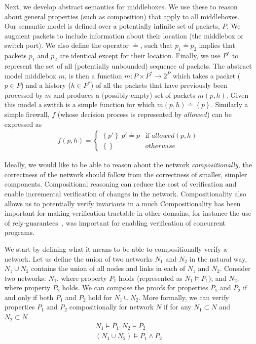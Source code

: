 Next, we develop abstract semantics for middleboxes. We use these to reason about general properties (such as composition) that apply to all middleboxes. Our semantic model is defined over a potentially infinite set of packets, $P$.  We augment packets to include information about their location (\ie the
middlebox or
switch port). We also define the operator $\doteq$, such that $p_1 \doteq p_2$ implies that packets $p_1$ and $p_2$ are identical except for their location.
Finally, we use $P^*$ to represent the set of all (potentially unbounded) sequence of packets.
The abstract model middlebox $m$, is then a function $m\colon P\times P^* \to 2^P$ which takes a packet ($p\in P$) and a history ($h\in P^*$) 
of all the packets that have
previously been processed by $m$ and produces a (possibly empty) set of packets $m(p, h)$. Given this model a switch is a simple function for which
$m(p, h) \doteq \left\{p\right\}$. Similarly a simple firewall, $f$ (whose decision process is represented by $allowed$) can be expressed as
\begin{align*}
 f(p, h) = \begin{cases}
    \left\{p'\right\}\ p' \doteq p & \mbox{if } allowed(p, h)\\
    \left\{\right\} & otherwise
 \end{cases}
\end{align*}

Ideally, we would like to be able to reason about the network \emph{compositionally}, \ie the correctness of the network should follow from
the correctness of smaller, simpler components. Compositional reasoning can reduce the cost of verification and enable incremental verification
of changes in the network. Compositionality also allows us to potentially verify invariants in a much 
Compositionality has been important for making verification tractable in other domains, for instance the use of
rely-guarantees~\cite{tse:MisraC81,ifip:Jones83}, was important for enabling verification of concurrent programs.

We start by defining what it means to be able to compositionally verify a network. Let us
define the union of two networks $N_1$ and $N_2$ in the natural way, \ie $N_1\cup N_2$ contains the union of all nodes and links in each of $N_1$ and $N_2$.
Consider two networks: $N_1$, where property $P_1$ holds (represented as $N_1\models P_1$); and $N_2$, where property $P_2$ holds. We can compose the proofs
for properties $P_1$ and $P_2$ if and only if  both $P_1$ and $P_2$ hold for $N_1 \cup N_2$. More formally, we can verify properties $P_1$ and $P_2$
compositionally for network $N$ if for any $N_1 \subset N$ and $N_2\subset N$
\begin{align*}
N_1 \models P_1,  N_2\models P_2\\
\hline
(N_1 \cup N_2) \models P_1\land P_2
\end{align*}

